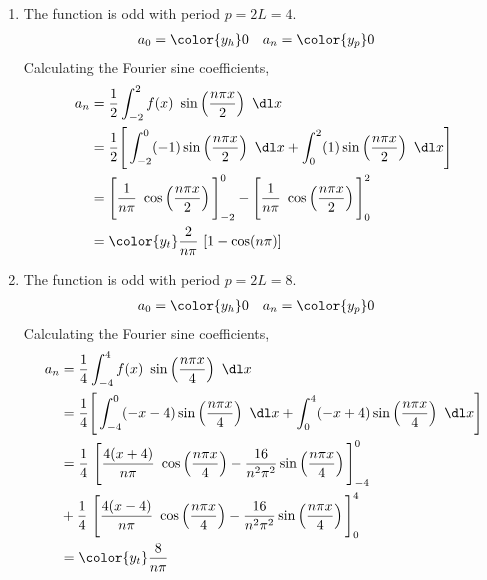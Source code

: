 \begin{enumerate}
    \item The function is odd with period $ p = 2L = 4 $.
          \begin{align}
              a_0 & = \color{y_h} 0 &
              a_n & = \color{y_p} 0
          \end{align}
          Calculating the Fourier sine coefficients,
          \begin{align}
              a_n & = \frac{1}{2} \int_{-2}^{2} f(x)\ \sin\left( \frac{n\pi x }{2}
              \right)\ \dl x                                                           \\
                  & = \frac{1}{2} \Bigg[\int_{-2}^{0} (-1) \sin\left( \frac{n\pi x}{2}
                  \right)\ \dl x
              + \int_{0}^{2} (1) \sin\left( \frac{n\pi x }{2} \right)\ \dl x \Bigg]    \\
                  & = \Bigg[ \frac{1}{n\pi}\ \cos\left( \frac{n\pi x}{2}
                  \right) \Bigg]_{-2}^{0}
              - \Bigg[ \frac{1}{n\pi}\ \cos\left( \frac{n\pi x}{2}
              \right) \Bigg]_{0}^{2}                                                   \\
                  & = \color{y_t} \frac{2}{n\pi}\ [1 - \cos(n\pi)]
          \end{align}

    \item The function is odd with period $ p = 2L = 8 $.
          \begin{align}
              a_0 & = \color{y_h} 0 &
              a_n & = \color{y_p} 0
          \end{align}
          Calculating the Fourier sine coefficients,
          \begin{align}
              a_n & = \frac{1}{4} \int_{-4}^{4} f(x)\ \sin\left( \frac{n\pi x}{4}
              \right)\ \dl x                                                           \\
                  & = \frac{1}{4} \Bigg[
                  \int_{-4}^{0} (-x-4) \sin\left( \frac{n\pi x}{4} \right)\ \dl x
              + \int_{0}^{4} (-x+4) \sin\left( \frac{n\pi x }{4} \right)\ \dl x \Bigg] \\
                  & = \frac{1}{4}\ \Bigg[ \frac{4(x+4)}{n\pi}\
                  \cos\left(\frac{n\pi x}{4}\right) - \frac{16}{n^2 \pi^2}
              \sin\left( \frac{n\pi x}{4} \right) \Bigg]_{-4}^{0}                      \\
                  & + \frac{1}{4}\ \Bigg[ \frac{4(x-4)}{n\pi}\
                  \cos\left(\frac{n\pi x}{4}\right) - \frac{16}{n^2 \pi^2}
              \sin\left( \frac{n\pi x}{4} \right) \Bigg]_{0}^{4}                       \\
                  & = \color{y_t} \frac{8}{n\pi}
          \end{align}


\end{enumerate}
